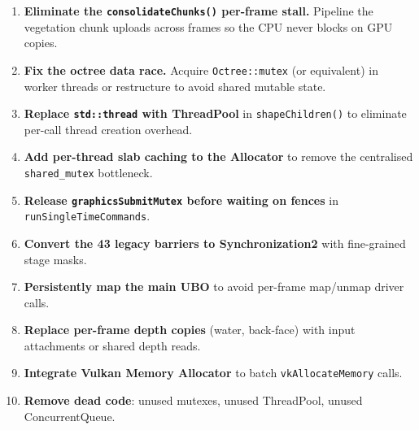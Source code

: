 \documentclass[a4paper,11pt]{article}
\begin{document}
\begin{enumerate}
\item \textbf{Eliminate the \texttt{consolidateChunks()} per-frame stall.}
      Pipeline the vegetation chunk uploads across frames so the CPU never
      blocks on GPU copies.
\item \textbf{Fix the octree data race.} Acquire \texttt{Octree::mutex} (or
      equivalent) in worker threads or restructure to avoid shared mutable
      state.
\item \textbf{Replace \texttt{std::thread} with ThreadPool} in
      \texttt{shapeChildren()} to eliminate per-call thread creation
      overhead.
\item \textbf{Add per-thread slab caching to the Allocator} to remove the
      centralised \texttt{shared\_mutex} bottleneck.
\item \textbf{Release \texttt{graphicsSubmitMutex} before waiting on
      fences} in \texttt{runSingleTimeCommands}.
\item \textbf{Convert the 43 legacy barriers to Synchronization2} with
      fine-grained stage masks.
\item \textbf{Persistently map the main UBO} to avoid per-frame
      map/unmap driver calls.
\item \textbf{Replace per-frame depth copies} (water, back-face) with
      input attachments or shared depth reads.
\item \textbf{Integrate Vulkan Memory Allocator} to batch
      \texttt{vkAllocateMemory} calls.
\item \textbf{Remove dead code}: unused mutexes, unused ThreadPool,
      unused ConcurrentQueue.
\end{enumerate}
\end{document}
